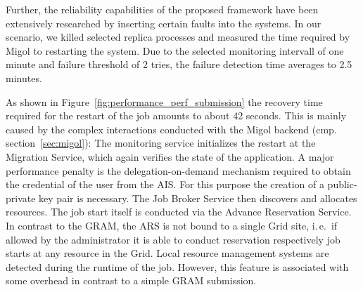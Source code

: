 \documentclass[times, 10pt,twocolumn]{article}
\begin{document}
Further, the reliability capabilities of the proposed framework have
been extensively researched by inserting certain faults into the
systems. In our scenario, we killed selected replica processes and
measured the time required by Migol to restarting the system.  Due to
the selected monitoring intervall of one minute and failure threshold
of 2 tries, the failure detection time averages to 2.5\, minutes.

As shown in Figure~\ref{fig:performance_perf_submission} the recovery
time required for the restart of the job amounts to about 42
seconds. This is mainly caused by the complex interactions conducted
with the Migol backend (cmp. section~\ref{sec:migol}): The monitoring
service initializes the restart at the Migration Service, which again
verifies the state of the application. A major performance penalty is
the delegation-on-demand mechanism required to obtain the credential
of the user from the AIS. For this purpose the creation of a
public-private key pair is necessary. The Job Broker Service then
discovers and allocates resources.  The job start itself is conducted
via the Advance Reservation Service. In contrast to the GRAM, the ARS
is not bound to a single Grid site, i.\,e.\ if allowed by the
administrator it is able to conduct reservation respectively job
starts at any resource in the Grid. Local resource management systems
are detected during the runtime of the job. However, this feature is
associated with some overhead in contrast to a simple GRAM submission.
\end{document}
